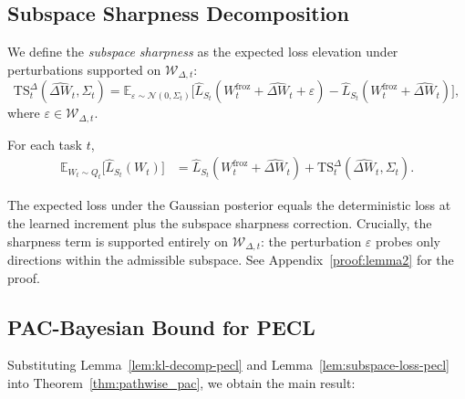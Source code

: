 \subsection{Subspace Sharpness Decomposition}
\label{sec:sharpness-decomp}

We define the \emph{subspace sharpness} as the expected loss elevation under perturbations supported on $\mathcal{W}_{\Delta,t}$:
\[
\mathrm{TS}_t^\Delta(\widehat{\Delta W}_t, \Sigma_t) = \mathbb{E}_{\varepsilon \sim \mathcal{N}(0,\Sigma_t)} \bigl[\hat{L}_{S_t}(W_t^{\mathrm{froz}} + \widehat{\Delta W}_t + \varepsilon) - \hat{L}_{S_t}(W_t^{\mathrm{froz}} + \widehat{\Delta W}_t)\bigr],
\]
where $\varepsilon \in \mathcal{W}_{\Delta,t}$.

\begin{lemma}
\label{lem:subspace-loss-pecl}
For each task $t$,
\begin{align*}
\mathbb{E}_{W_t \sim Q_t}\bigl[\hat{L}_{S_t}(W_t)\bigr]
&= \hat{L}_{S_t}(W_t^{\mathrm{froz}} + \widehat{\Delta W}_t) + \mathrm{TS}_t^\Delta(\widehat{\Delta W}_t, \Sigma_t).
\end{align*}
\end{lemma}

The expected loss under the Gaussian posterior equals the deterministic loss at the learned increment plus the subspace sharpness correction.
Crucially, the sharpness term is supported entirely on $\mathcal{W}_{\Delta,t}$: the perturbation $\varepsilon$ probes only directions within the admissible subspace.
See Appendix~\ref{proof:lemma2} for the proof.

\subsection{PAC-Bayesian Bound for PECL}
\label{sec:pecl-bound}

Substituting Lemma~\ref{lem:kl-decomp-pecl} and Lemma~\ref{lem:subspace-loss-pecl} into Theorem~\ref{thm:pathwise_pac}, we obtain the main result:

